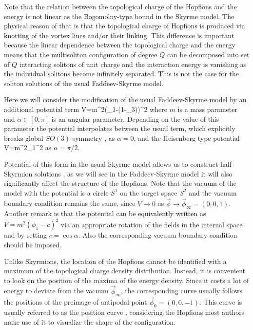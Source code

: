 \documentclass[12pt,a4paper]{article}
\begin{document}
Note that the relation between the topological charge
of the Hopfions and the energy is not linear as
the Bogomolny-type bound  in the Skyrme model. The physical reason of that is that the topological charge
of Hopfions is produced via knotting of the vortex lines and/or their linking. This difference is important because the linear
dependence between the topological charge and the energy means that the multisoliton
configuration of degree $Q$ can be decomposed into set of
$Q$ interacting solitons of unit charge and the interaction energy is vanishing as the individual solitons become infinitely separated.
This is not the case for the soliton solutions of the usual Faddeev-Skyrme model.


Here we will consider the modification of the usual Faddeev-Skyrme model by an additional
potential term
\be\label{potential}
V=m^2\left(\phi_1\sin\alpha-(1-\phi_3)\cos\alpha\right)^2
\ee
where $m$ is a mass parameter and $\alpha\in [0,\pi]$ is an angular parameter. Depending on the value of this parameter the potential
interpolates between the usual term,
which explicitly breaks global $SO(3)$ symmetry \cite{Kundu:1982bc,Foster:2010zb,Harland:2013uk,Battye:2013xf}, as $\alpha=0$, and
the Heisenberg type potential
\be
V=m^2{\phi_1}^2
\ee
as $\alpha=\pi/2$.

Potential of this form in the usual Skyrme model allows us to construct half-Skyrmion solutions \cite{Gudnason:2015nxa}, as we will
see in the Faddeev-Skyrme model it will also significantly affect the structure of the Hopfions.
Note that the vacuum of the model with the potential  is a circle $S^1$ on the target space
$S^2$ and the vacuum boundary
condition remains the same, since  $V\to 0$ as $\vec \phi\to \vec\phi_\infty = (0,0,1)$.
Another remark is that the potential  can be equivalently written as
$V=m^2(\phi_1-c)^2$ via an appropriate rotation of the fields in the internal space and by setting $c=\cos\alpha$. Also
the corresponding vacuum boundary condition should be imposed.

Unlike Skyrmions, the location of the Hopfions cannot be identified with a
maximum of the topological charge density
distribution. Instead, it is convenient to look on the position of the maxima of the energy density.
Since it costs a lot of energy to deviate from the vacuum $\vec \phi_\infty$, the corresponding curve usually
follows the positions of the preimage of antipodal point  $\vec\phi_0 = (0,0,-1)$.
This curve is usually referred to as the position curve \cite{Sutcliffe:2007ui}, considering the Hopfions most authors make use of it
to visualize the shape of the configuration.
\end{document}
